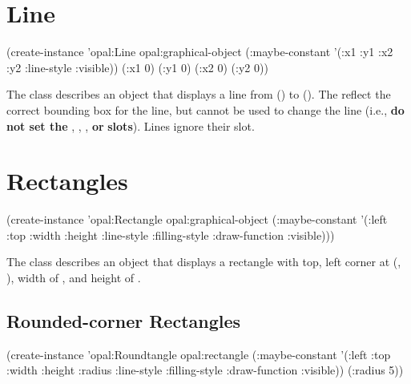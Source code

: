 \section{Line}

\begin{programexample}


(create-instance 'opal:Line opal:graphical-object
  (:maybe-constant '(:x1 :y1 :x2 :y2 :line-style :visible))
  (:x1 0)
  (:y1 0)
  (:x2 0)
  (:y2 0))
\end{programexample}

The  class describes an object that displays a line from
() to ().  The  reflect the correct bounding box for the line, but
cannot be used to change the line (i.e., {\bf do not set the} ,
, , {\bf or}  {\bf slots}).  Lines ignore
their  slot.

\section{Rectangles}

\begin{programexample}


(create-instance 'opal:Rectangle opal:graphical-object
  (:maybe-constant '(:left :top :width :height :line-style :filling-style
		     :draw-function :visible)))
\end{programexample}

The  class describes an object that displays a rectangle with
top, left corner at (, ), width of , and height
of .


\subsection{Rounded-corner Rectangles}

\begin{programexample}

 

(create-instance 'opal:Roundtangle opal:rectangle
  (:maybe-constant '(:left :top :width :height :radius :line-style
		     :filling-style :draw-function :visible))
  (:radius 5))
\end{programexample}

